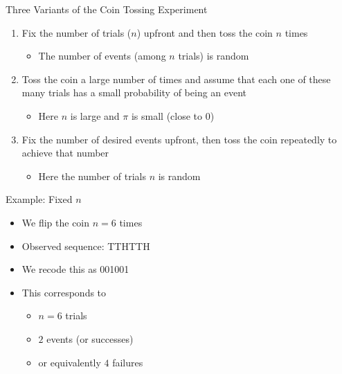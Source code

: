 \documentclass[xcolor=x11names,compress]{beamer}\usepackage[]{graphicx}\usepackage[]{color}
\begin{document}
\begin{frame}{Three Variants of the Coin Tossing Experiment}
  \begin{enumerate}
  \item Fix the number of trials ($n$) upfront and then toss the coin $n$ times
    \begin{itemize}
    \item The number of events (among $n$ trials) is random
    \end{itemize}
  \item Toss the coin a large number of times and assume that each one of these many trials has a small probability of being an event
    \begin{itemize}
    \item Here $n$ is large and $\pi$ is small (close to 0)
    \end{itemize}
  \item Fix the number of desired events upfront, then toss the coin repeatedly to achieve that number
    \begin{itemize}
    \item Here the number of trials $n$ is random
    \end{itemize}
  \end{enumerate}
\end{frame}


\begin{frame}{Example: Fixed $n$}
  \begin{itemize}
  \item We flip the coin $n=6$ times
  \item Observed sequence: TTHTTH
  \item We recode this as 001001
  \item This corresponds to
    \begin{itemize}
    \item $n=6$ trials
    \item $2$ events (or successes)
    \item or equivalently $4$ failures
    \end{itemize}
  \end{itemize}
\end{frame}
\end{document}
